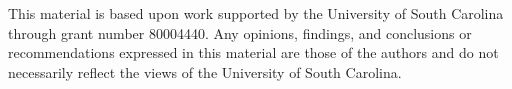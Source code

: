 \documentclass[]{spie}  %
\begin{document}
	\acknowledgments %
	
	This material is based upon work supported by the University of South Carolina through grant number 80004440. Any opinions, findings, and conclusions or recommendations expressed in this material are those of the authors and do not necessarily reflect the views of the University of South Carolina.

	
\end{document}
